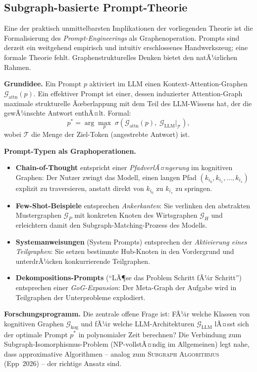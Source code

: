 ﻿\documentclass[12pt,a4paper]{article}
\theoremstyle{plain}
\theoremstyle{definition}
\theoremstyle{remark}
\newcommand{\GG}{\mathcal{G}}
\newcommand{\SA}{\textnormal{\textsc{Subgraph Algorithmus}}}
\begin{document}
\subsection{Subgraph-basierte Prompt-Theorie}
\label{subsec:prompt}

Eine der praktisch unmittelbarsten Implikationen der vorliegenden Theorie ist die Formalisierung des \emph{Prompt-Engineerings} als Graphenoperation. Prompts sind derzeit ein weitgehend empirisch und intuitiv erschlossenes Handwerkszeug; eine formale Theorie fehlt. Graphenstrukturelles Denken bietet den natÃ¼rlichen Rahmen.

\textbf{Grundidee.} Ein Prompt $p$ aktiviert im LLM einen Kontext-Attention-Graphen $\GG_{\text{attn}}(p)$. Ein effektiver Prompt ist einer, dessen induzierter Attention-Graph maximale strukturelle Ãœberlappung mit dem Teil des LLM-Wissens hat, der die gewÃ¼nschte Antwort enthÃ¤lt. Formal:
\[
  p^* = \arg\max_p\; \sigma\!\left(\GG_{\text{attn}}(p),\; \GG_{\text{LLM}}|_{\mathcal{T}}\right),
\]
wobei $\mathcal{T}$ die Menge der Ziel-Token (angestrebte Antwort) ist.

\textbf{Prompt-Typen als Graphoperationen.}
\begin{itemize}
  \item \textbf{Chain-of-Thought} entspricht einer \emph{PfadverlÃ¤ngerung} im kognitiven Graphen: Der Nutzer zwingt das Modell, einen langen Pfad $(k_{i_0}, k_{i_1}, \ldots, k_{i_s})$ explizit zu traversieren, anstatt direkt von $k_{i_0}$ zu $k_{i_s}$ zu springen.
  \item \textbf{Few-Shot-Beispiele} entsprechen \emph{Ankerkanten}: Sie verlinken den abstrakten Mustergraphen $\GG_P$ mit konkreten Knoten des Wirtsgraphen $\GG_H$ und erleichtern damit den Subgraph-Matching-Prozess des Modells.
  \item \textbf{Systemanweisungen} (System Prompts) entsprechen der \emph{Aktivierung eines Teilgraphen}: Sie setzen bestimmte Hub-Knoten in den Vordergrund und unterdrÃ¼cken konkurrierende Teilgraphen.
  \item \textbf{Dekompositions-Prompts} (``LÃ¶se das Problem Schritt fÃ¼r Schritt'') entsprechen einer \emph{GoG-Expansion}: Der Meta-Graph der Aufgabe wird in Teilgraphen der Unterprobleme explodiert.
\end{itemize}

\textbf{Forschungsprogramm.} Die zentrale offene Frage ist: FÃ¼r welche Klassen von kognitiven Graphen $\GG_{\text{kog}}$ und fÃ¼r welche LLM-Architekturen $\GG_{\text{LLM}}$ lÃ¤sst sich der optimale Prompt $p^*$ in polynomialer Zeit berechnen? Die Verbindung zum Subgraph-Isomorphismus-Problem (NP-vollstÃ¤ndig im Allgemeinen) legt nahe, dass approximative Algorithmen -- analog zum \SA{} (Epp~2026) -- der richtige Ansatz sind.
\end{document}
